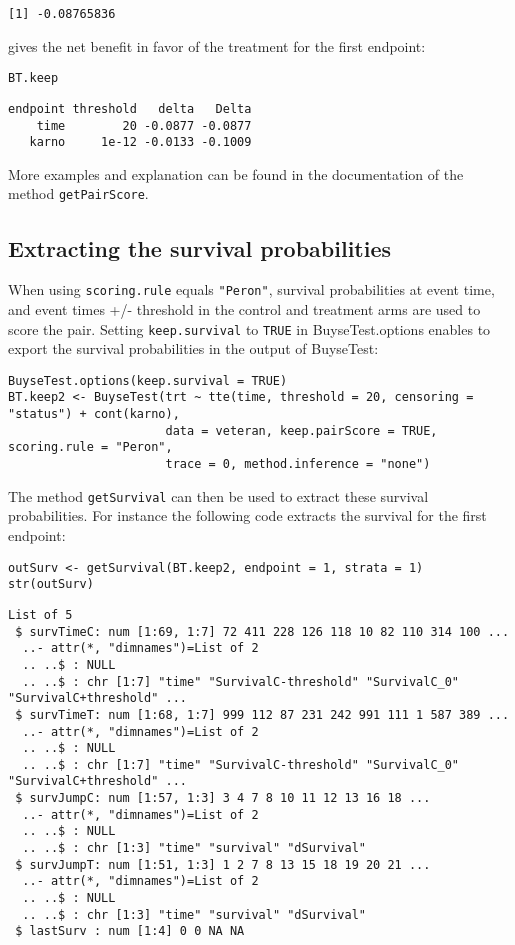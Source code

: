 \documentclass[12pt]{article}
\begin{document}
\begin{verbatim}
[1] -0.08765836
\end{verbatim}

gives the net benefit in favor of the treatment for the first
endpoint:
\lstset{language=r,label= ,caption= ,captionpos=b,numbers=none}
\begin{lstlisting}
BT.keep
\end{lstlisting}

\begin{verbatim}
endpoint threshold   delta   Delta
    time        20 -0.0877 -0.0877
   karno     1e-12 -0.0133 -0.1009
\end{verbatim}

More examples and explanation can be found in the documentation of
the method \texttt{getPairScore}.

\subsection{Extracting the survival probabilities}
\label{sec:org0dfcf36}
When using \texttt{scoring.rule} equals \texttt{"Peron"}, survival probabilities at
event time, and event times +/- threshold in the control and treatment
arms are used to score the pair. Setting \texttt{keep.survival} to \texttt{TRUE} in
BuyseTest.options enables to export the survival probabilities in the
output of BuyseTest:
\lstset{language=r,label= ,caption= ,captionpos=b,numbers=none}
\begin{lstlisting}
BuyseTest.options(keep.survival = TRUE)
BT.keep2 <- BuyseTest(trt ~ tte(time, threshold = 20, censoring = "status") + cont(karno),
					  data = veteran, keep.pairScore = TRUE, scoring.rule = "Peron",
					  trace = 0, method.inference = "none")
\end{lstlisting}

The method \texttt{getSurvival} can then be used to extract these survival
probabilities. For instance the following code extracts the survival
for the first endpoint:
\lstset{language=r,label= ,caption= ,captionpos=b,numbers=none}
\begin{lstlisting}
outSurv <- getSurvival(BT.keep2, endpoint = 1, strata = 1)
str(outSurv)
\end{lstlisting}

\begin{verbatim}
List of 5
 $ survTimeC: num [1:69, 1:7] 72 411 228 126 118 10 82 110 314 100 ...
  ..- attr(*, "dimnames")=List of 2
  .. ..$ : NULL
  .. ..$ : chr [1:7] "time" "SurvivalC-threshold" "SurvivalC_0" "SurvivalC+threshold" ...
 $ survTimeT: num [1:68, 1:7] 999 112 87 231 242 991 111 1 587 389 ...
  ..- attr(*, "dimnames")=List of 2
  .. ..$ : NULL
  .. ..$ : chr [1:7] "time" "SurvivalC-threshold" "SurvivalC_0" "SurvivalC+threshold" ...
 $ survJumpC: num [1:57, 1:3] 3 4 7 8 10 11 12 13 16 18 ...
  ..- attr(*, "dimnames")=List of 2
  .. ..$ : NULL
  .. ..$ : chr [1:3] "time" "survival" "dSurvival"
 $ survJumpT: num [1:51, 1:3] 1 2 7 8 13 15 18 19 20 21 ...
  ..- attr(*, "dimnames")=List of 2
  .. ..$ : NULL
  .. ..$ : chr [1:3] "time" "survival" "dSurvival"
 $ lastSurv : num [1:4] 0 0 NA NA
\end{verbatim}
\end{document}
